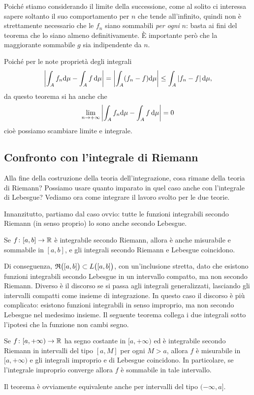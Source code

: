 Poich\'e stiamo considerando il limite della successione, come al solito ci interessa sapere soltanto il suo comportamento per $n$ che tende all'infinito, quindi non è strettamente necessario che le $f_n$ siano sommabili \emph{per ogni} $n$: basta ai fini del teorema che lo siano almeno definitivamente.
È importante però che la maggiorante sommabile $g$ sia indipendente da $n$.
\begin{osservazione} \label{o:convergenza-dominata}
	Poich\'e per le note proprietà degli integrali
	\begin{equation*}
		\left|{\int_Af_n\textup{d}\mu-\int_Af\,\textup{d}\mu}\right|=\left|{\int_A(f_n-f)\textup{d}\mu}\right|\leq\int_A\left|{f_n-f}\right|\textup{d}\mu,
	\end{equation*}
	da questo teorema si ha anche che
	\begin{equation}
		\lim_{n\to+\infty}\left|{\int_Af_n\textup{d}\mu-\int_Af\,\textup{d}\mu}\right|=0
	\end{equation}
	cioè possiamo scambiare limite e integrale.
\end{osservazione}

\subsection{Confronto con l'integrale di Riemann}
Alla fine della costruzione della teoria dell'integrazione, cosa rimane della teoria di Riemann?
Possiamo usare quanto imparato in quel caso anche con l'integrale di Lebesgue?
Vediamo ora come integrare il lavoro svolto per le due teorie. %

Innanzitutto, partiamo dal caso ovvio: tutte le funzioni integrabili secondo Riemann (in senso proprio) lo sono anche secondo Lebesgue.
\begin{teorema} \label{t:integrale-riemann-lebesgue}
	Se $f\colon[a,b]\to\mathbb{R}$ è integrabile secondo Riemann, allora è anche misurabile e sommabile in $[a,b]$, e gli integrali secondo Riemann e Lebesgue coincidono.
\end{teorema}
Di conseguenza, $\mathfrak{R}\big([a,b]\big)\subset L\big([a,b]\big)$, con un'inclusione stretta, dato che esistono funzioni integrabili secondo Lebesgue in un intervallo compatto, ma non secondo Riemann.
Diverso è il discorso se si passa agli integrali generalizzati, lasciando gli intervalli compatti come insieme di integrazione.
In questo caso il discorso è più complicato: esistono funzioni integrabili in senso improprio, ma non secondo Lebesgue nel medesimo insieme.
Il seguente teorema collega i due integrali sotto l'ipotesi che la funzione non cambi segno.
\begin{teorema} \label{t:integrale-improprio-lebesgue}
	Se $f\colon[a,+\infty)\to\mathbb{R}$ ha segno costante in $[a,+\infty)$ ed è integrabile secondo Riemann in intervalli del tipo $[a,M]$ per ogni $M>a$, allora $f$ è misurabile in $[a,+\infty)$ e gli integrali improprio e di Lebesgue coincidono.
	In particolare, se l'integrale improprio converge allora $f$ è sommabile in tale intervallo.
\end{teorema}
Il teorema è ovviamente equivalente anche per intervalli del tipo $(-\infty,a]$.

